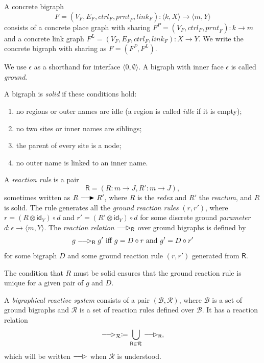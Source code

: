 \documentclass[runningheads]{llncs}
\newcommand\ctrl{\mathit{ctrl}}
\newcommand\prnt{\mathit{prnt}}
\newcommand\link{\mathit{link}}
\newcommand\id{\mathsf{id}}
\providecommand\longrightarrowRHD{\relbar\joinrel\relbar\joinrel\mathrel\RHD}
\providecommand\longrightarrowrhd{\relbar\joinrel\relbar\joinrel\mathrel\rhd}
\begin{document}
\begin{definition}
  A concrete bigraph
  \[ F = (V_F, E_F, \ctrl_F, \prnt_F, \link_F) : \langle k, X \rangle \to
    \langle m, Y \rangle \]
  consists of a concrete place graph with sharing $F^P = (V_F, \ctrl_F, \prnt_F)
  : k \to m$ and a concrete link graph $F^L = (V_F, E_F, \ctrl_F, \link_F) : X
  \to Y$. We write the concrete bigraph with sharing as $F = (F^P, F^L)$.
\end{definition}

We use $\epsilon$ as a shorthand for interface $\langle 0, \emptyset \rangle$. A
bigraph with inner face $\epsilon$ is called \emph{ground}.

\begin{definition} \label{solid}
  A bigraph is \emph{solid} if these conditions hold:
  \begin{enumerate}
  \item no regions or outer names are idle (a region is called \emph{idle}
    if it is empty);
  \item no two sites or inner names are siblings;
  \item the parent of every site is a node;
  \item no outer name is linked to an inner name.
  \end{enumerate}
\end{definition}

\begin{definition} \label{reaction_rule}
  A \emph{reaction rule} is a pair
  \[ \mathsf{R} = (R : m \to J, R' : m \to J), \]
  sometimes written as $R \longrightarrowRHD R'$, where $R$ is the \emph{redex}
  and $R'$ the \emph{reactum}, and $R$ is solid. The rule generates all the
  \emph{ground reaction rules} $(r, r')$, where $r = (R \otimes \id_Y) \circ d$
  and $r' = (R' \otimes \id_Y) \circ d$ for some discrete ground
  \emph{parameter} $d : \epsilon \to \langle m, Y \rangle$. The \emph{reaction
    relation} $\longrightarrowrhd_{\mathsf{R}}$ over ground bigraphs is defined
  by
  \[ g \longrightarrowrhd_{\mathsf{R}} g' \text{ iff } g = D \circ r \text{ and
    } g' = D \circ r' \]
  for some bigraph $D$ and some ground reaction rule $(r, r')$ generated from
  $\mathsf{R}$.
\end{definition}

The condition that $R$ must be solid ensures that the ground reaction rule is
unique for a given pair of $g$ and $D$.

\begin{definition}
  A \emph{bigraphical reactive system} consists of a pair $(\mathcal{B},
  \mathcal{R})$, where $\mathcal{B}$ is a set of ground bigraphs and
  $\mathcal{R}$ is a set of reaction rules defined over $\mathcal{B}$. It has a
  reaction relation
  \[ \longrightarrowrhd_{\mathcal{R}} \coloneqq \bigcup_{\mathsf{R} \in
      \mathcal{R}} \longrightarrowrhd_{\mathsf{R}}, \]
  which will be written $\longrightarrowrhd$ when $\mathcal{R}$ is understood.
\end{definition}
\end{document}
